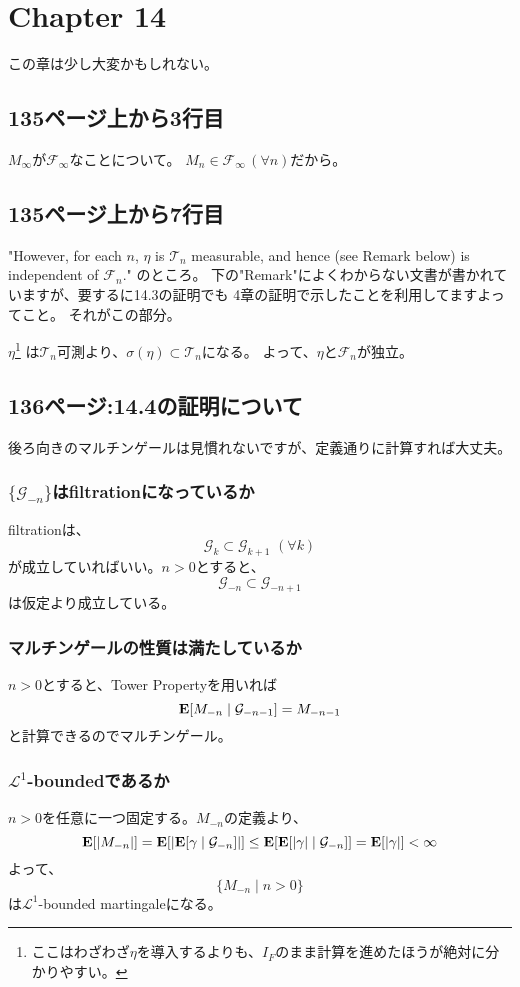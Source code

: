 \section{Chapter 14}
  この章は少し大変かもしれない。
  \subsection{135ページ上から3行目}
    $M_{\infty}$が$\mathcal{F}_{\infty}$なことについて。
    $M_n \in \mathcal{F}_{\infty} \, (\forall n)$だから。

  \subsection{135ページ上から7行目}
    "However, for each $n$, $\eta$ is $\mathcal{T}_n$ measurable,
     and hence (see Remark below) is independent of $\mathcal{F}_n$."
    のところ。
    下の"Remark"によくわからない文書が書かれていますが、要するに14.3の証明でも
    4章の証明で示したことを利用してますよってこと。
    それがこの部分。

    $\eta$\footnote{ここはわざわざ$\eta$を導入するよりも、$I_F$のまま計算を進めたほうが絶対に分かりやすい。}
    は$\mathcal{T}_n$可測より、$\sigma(\eta) \subset \mathcal{T}_n$になる。
    よって、$\eta$と$\mathcal{F}_n$が独立。

  \subsection{136ページ:14.4の証明について}
    後ろ向きのマルチンゲールは見慣れないですが、定義通りに計算すれば大丈夫。
    \subsubsection{$\{\mathcal{G}_{-n}\}$はfiltrationになっているか}
      filtrationは、
      \[\mathcal{G}_{k} \subset \mathcal{G}_{k+1} \,\, (\forall k)\]
      が成立していればいい。$n >0$とすると、
      \[\mathcal{G}_{-n} \subset \mathcal{G}_{-n+1}\]
      は仮定より成立している。

    \subsubsection{マルチンゲールの性質は満たしているか}
      $n > 0$とすると、Tower Propertyを用いれば
      \[{\mathbf{E}}[M_{-n} \mid \mathcal{G}_{-n - 1}] = M_{-n - 1}\]
      と計算できるのでマルチンゲール。

    \subsubsection{$\mathcal{L}^1$-boundedであるか}
      $n>0$を任意に一つ固定する。$M_{-n}$の定義より、
      \[{\mathbf{E}}[|M_{-n}|] = {\mathbf{E}}[|{\mathbf{E}}[\gamma \mid \mathcal{G}_{-n}]|] \leq {\mathbf{E}}[{\mathbf{E}}[|\gamma| \mid \mathcal{G}_{-n}]] = {\mathbf{E}}[|\gamma|] < \infty\]
      よって、
      \[\{M_{-n} \mid n > 0\}\]は$\mathcal{L}^1$-bounded martingaleになる。

